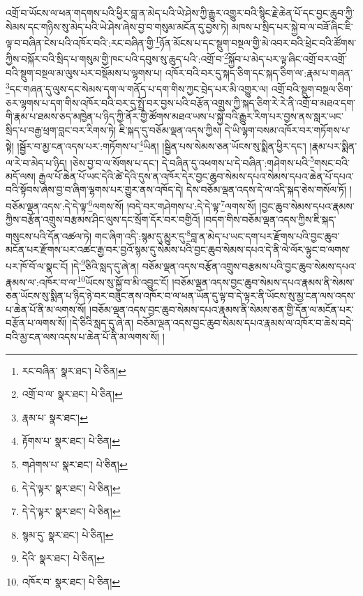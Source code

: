 འགྲོ་བ་ཡོངས་ལ་ཕན་གདགས་པའི་ཕྱིར་བླ་ན་མེད་པའི་ཡེ་ཤེས་ཀྱི་རྒྱུར་འགྱུར་བའི་སྙིང་རྗེ་ཆེན་པོ་དང་བྱང་ཆུབ་ཀྱི་སེམས་དང་གཉིས་སུ་མེད་པའི་ཡེ་ཤེས་ཞེས་བྱ་བ་གསུམ་མངོན་དུ་བྱས་ཏེ། མཁས་པ་སྲིད་པར་སྐྱེ་བ་ལ་བཟོ་ཞིང་ཇི་ལྟ་བ་བཞིན་ངེས་པའི་འཁོར་བའི་:རང་བཞིན་གྱི་\footnote{རང་བཞིན་  སྣར་ཐང་།  པེ་ཅིན། }ཉོན་མོངས་པ་དང་སྡུག་བསྔལ་གྱི་མེ་འབར་བའི་ཕྲེང་བའི་ཚོགས་ཀྱིས་བསྐོར་བའི་སྲིད་པ་གསུམ་གྱི་ཁང་པའི་དབུས་སུ་ཆུད་པའི་:འགྲོ་བ་\footnote{འགྲོ་བ་ལ་  སྣར་ཐང་།  པེ་ཅིན། }སྐྱོབ་པ་མེད་པར་ལྟ་ཞིང་འགྲོ་བར་འགྲོ་བའི་སྡུག་བསྔལ་མ་ལུས་པར་བསྡོམས་པ་ལྷགས་པ། འཁོར་བའི་བར་དུ་སྐད་ཅིག་དང་སྐད་ཅིག་ལ་:རྣམ་པ་གཞན་\footnote{རྣམ་པ་  སྣར་ཐང་། }དང་གཞན་དུ་ལུས་དང་སེམས་དག་ལ་གནོད་པ་དག་གིས་ཀྱང་བྲེད་པར་མི་འགྱུར་ལ། འགྲོ་བའི་སྡུག་བསྔལ་ཅིག་ཅར་ལྷགས་པ་དག་གིས་འཁོར་བའི་བར་དུ་སྤྲོ་བར་བྱས་པའི་བརྩོན་འགྲུས་ཀྱི་སྐད་ཅིག་རེ་རེ་ནི་འགྲོ་བ་མཐའ་དག་གི་རྣམ་པ་ཐམས་ཅད་མཁྱེན་པ་ཉིད་ཀྱི་ནོར་གྱི་ཚོགས་མཐའ་ཡས་པ་སྐྱེ་བའི་རྒྱུར་རིག་པར་བྱས་ནས་སླར་ཡང་སྲིད་པ་བརྒྱ་ཕྲག་བླང་བར་རིགས་ཏེ། ཇི་སྐད་དུ་བཅོམ་ལྡན་འདས་ཀྱིས། དེ་ཡི་ལྷག་བསམ་འཁོར་བར་གཏོགས་པ་སྟེ། །སྦྱོར་བ་མྱ་ངན་འདས་པར་:གཏོགས་པ་\footnote{རྟོགས་པ་  སྣར་ཐང་།  པེ་ཅིན། }ཡིན། །སྦྱིན་པས་སེམས་ཅན་ཡོངས་སུ་སྨིན་ཕྱིར་དང་། །རྣམ་པར་སྨིན་ལ་རེ་བ་མེད་པ་ཉིད། །ཅེས་བྱ་བ་ལ་སོགས་པ་དང་། དེ་བཞིན་དུ་འཕགས་པ་དེ་བཞིན་:གཤེགས་པའི་\footnote{གཤེགས་པ་  སྣར་ཐང་།  པེ་ཅིན། }གསང་བའི་མདོ་ལས། རྒྱལ་པོ་ཆེན་པོ་ཡང་དེའི་ཚེ་དེའི་དུས་ན་འཁོར་དེར་བྱང་ཆུབ་སེམས་དཔའ་སེམས་དཔའ་ཆེན་པོ་དཔའ་བའི་སྟོབས་ཞེས་བྱ་བ་ཞིག་ལྷགས་པར་གྱུར་ནས་འཁོད་དེ། དེས་བཅོམ་ལྡན་འདས་དེ་ལ་འདི་སྐད་ཅེས་གསོལ་ཏོ། །བཅོམ་ལྡན་འདས་:དེ་དེ་ལྟ་\footnote{དེ་དེ་ལྟར་  སྣར་ཐང་།  པེ་ཅིན། }ལགས་སོ། །བདེ་བར་གཤེགས་པ་:དེ་དེ་ལྟ་\footnote{དེ་དེ་ལྟར་  སྣར་ཐང་།  པེ་ཅིན། }ལགས་སོ། །བྱང་ཆུབ་སེམས་དཔའ་རྣམས་ཀྱིས་བརྩོན་འགྲུས་བརྩམས་ཤིང་ལུས་དང་སྲོག་དོར་བར་བགྱིའོ། །བདག་གིས་བཅོམ་ལྡན་འདས་ཀྱིས་ཇི་སྐད་གསུངས་པའི་དོན་འཚལ་ཏེ། གང་ཞིག་འདི་:སྙམ་དུ་མྱུར་དུ་\footnote{སྙམ་དུ་  སྣར་ཐང་།  པེ་ཅིན། }བླ་ན་མེད་པ་ཡང་དག་པར་རྫོགས་པའི་བྱང་ཆུབ་མངོན་པར་རྫོགས་པར་འཚང་རྒྱ་བར་བྱའོ་སྙམ་དུ་སེམས་པའི་བྱང་ཆུབ་སེམས་དཔའ་དེ་ནི་ལེ་ལོར་ལྟུང་བ་ལགས་པར་ཁོ་བོ་ལ་སྣང་ངོ། །དེ་\footnote{དེའི་  སྣར་ཐང་།  པེ་ཅིན། }ཅིའི་སླད་དུ་ཞེ་ན། བཅོམ་ལྡན་འདས་བརྩོན་འགྲུས་བརྩམས་པའི་བྱང་ཆུབ་སེམས་དཔའ་རྣམས་ལ་:འཁོར་བ་ལ་\footnote{འཁོར་བ་  སྣར་ཐང་།  པེ་ཅིན། }ཡོངས་སུ་སྐྱོ་བ་མི་འབྱུང་ངོ། །བཅོམ་ལྡན་འདས་བྱང་ཆུབ་སེམས་དཔའ་རྣམས་ནི་སེམས་ཅན་ཡོངས་སུ་སྨིན་པ་ཉིད་ཉེ་བར་བཟུང་ནས་འཁོར་བ་ལ་ཕན་ཡོན་དུ་ལྟ་བ་དེ་ལྟར་ནི་ཡོངས་སུ་མྱ་ངན་ལས་འདས་པ་ཆེན་པོ་ནི་མ་ལགས་སོ། །བཅོམ་ལྡན་འདས་བྱང་ཆུབ་སེམས་དཔའ་རྣམས་ནི་སེམས་ཅན་གྱི་དོན་ལ་མངོན་པར་བརྩོན་པ་ལགས་སོ། །དེ་ཅིའི་སླད་དུ་ཞེ་ན། བཅོམ་ལྡན་འདས་བྱང་ཆུབ་སེམས་དཔའ་རྣམས་ལ་འཁོར་བ་ཆེས་བདེ་བའི་མྱ་ངན་ལས་འདས་པ་ཆེན་པོ་ནི་མ་ལགས་སོ། །

